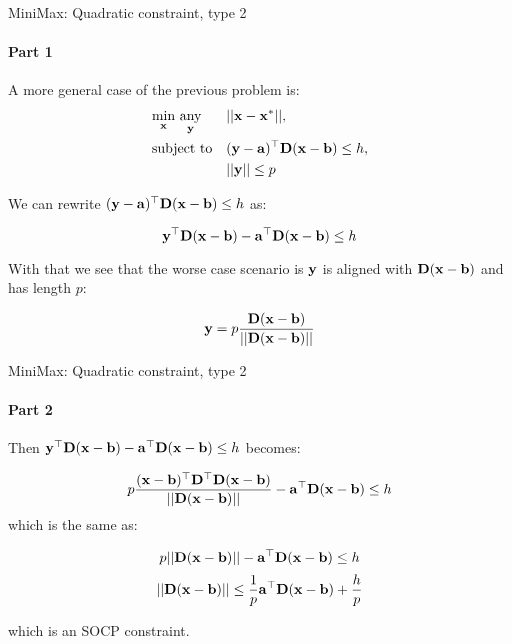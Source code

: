 \documentclass{beamer}
\begin{document}
\begin{frame}{MiniMax: Quadratic constraint, type 2}
\framesubtitle{Part 1}
\begin{flushleft}

A more general case of the previous problem is:
%
\begin{equation}
\begin{aligned}
& \underset{\mathbf{x}}{\text{min}} \ \underset{\mathbf{y}}{\text{any}}
& & ||\mathbf{x} - \mathbf{x}^*||, \\
& \text{subject to}
& & (\mathbf{y} - \mathbf{a})^\top \mathbf{D} (\mathbf{x} - \mathbf{b}) \leq h, \\
& & & ||\mathbf{y}|| \leq p
\end{aligned}
\end{equation}
%

We can rewrite $(\mathbf{y} - \mathbf{a})^\top \mathbf{D} (\mathbf{x} - \mathbf{b}) \leq h$ as:

\begin{equation}
    \mathbf{y}^\top \mathbf{D} (\mathbf{x} - \mathbf{b}) - \mathbf{a}^\top \mathbf{D} (\mathbf{x} - \mathbf{b}) \leq h
\end{equation}

With that we see that the worse case scenario is $\mathbf{y}$ is aligned with $\mathbf{D} (\mathbf{x} - \mathbf{b})$ and has length $p$:

\begin{equation}
    \mathbf{y} = p \frac{\mathbf{D} (\mathbf{x} - \mathbf{b})}{|| \mathbf{D} (\mathbf{x} - \mathbf{b}) ||}
\end{equation}

 
\end{flushleft}
\end{frame}




\begin{frame}{MiniMax: Quadratic constraint, type 2}
\framesubtitle{Part 2}
\begin{flushleft}

Then $\mathbf{y}^\top \mathbf{D} (\mathbf{x} - \mathbf{b}) - \mathbf{a}^\top \mathbf{D} (\mathbf{x} - \mathbf{b}) \leq h$ becomes:

\begin{equation}
    p \frac{ (\mathbf{x} - \mathbf{b})^\top \mathbf{D}^\top \mathbf{D} (\mathbf{x} - \mathbf{b}) }{|| \mathbf{D} (\mathbf{x} - \mathbf{b}) ||}  - \mathbf{a}^\top \mathbf{D} (\mathbf{x} - \mathbf{b}) \leq h
\end{equation}
%
which is the same as:

\begin{equation}
    p || \mathbf{D} (\mathbf{x} - \mathbf{b}) || - \mathbf{a}^\top \mathbf{D} (\mathbf{x} - \mathbf{b}) \leq h
\end{equation}
\begin{equation}
    || \mathbf{D} (\mathbf{x} - \mathbf{b}) ||  \leq \frac{1}{p}\mathbf{a}^\top \mathbf{D} (\mathbf{x} - \mathbf{b}) + \frac{h}{p}
\end{equation}

which is an SOCP constraint.
 
\end{flushleft}
\end{frame}
\end{document}
